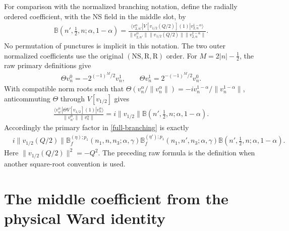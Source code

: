 \documentclass[12pt]{article}
\newcommand{\ie}{\begin{equation}\begin{aligned}}
\newcommand{\fe}{\end{aligned}\end{equation}}
\newcommand{\NS}{\mathrm{NS}}
\newcommand{\R}{\mathrm{R}}
\numberwithin{equation}{section}
\begin{document}
For comparison with the normalized branching notation, define the
radially ordered coefficient, with the NS field in the middle slot, by
\ie
 \mathbb B(n',\tfrac12,n;\alpha,1-\alpha)
 =\frac{\langle v_{2,n'}^\alpha|V[v_{1/2}(Q/2)](1)
 |v_{2,n}^{1-\alpha}\rangle}
 {\|v_{2,n'}^\alpha\|\|v_{1/2}(Q/2)\|
  \|v_{2,n}^{1-\alpha}\|}.
 \label{radial-B}
\fe
No permutation of punctures is implicit in this notation.  The two
outer normalized coefficients use the original $(\NS,\R,\R)$ order.
For $M=2|n|-\frac12$, the raw primary definitions give
\ie
 \Theta v_n^0=-2^{(-1)^M/2}v_n^1,\qquad
 \Theta v_n^1=2^{-(-1)^M/2}v_n^0.
 \label{theta-primary}
\fe
With compatible norm roots such that
$\Theta(v_n^\alpha/\|v_n^\alpha\|)=-i
v_n^{1-\alpha}/\|v_n^{1-\alpha}\|$, anticommuting $\Theta$ through
$V[v_{1/2}]$ gives
\ie
 \frac{\langle v_{n'}^\alpha|\Theta V[v_{1/2}](1)|v_n^\alpha\rangle}
 {\|v_{n'}^\alpha\|\|v_n^\alpha\|}
 =i\|v_{1/2}\|\mathbb B(n',\tfrac12,n;\alpha,1-\alpha).
 \label{normalized-middle}
\fe
Accordingly the primary factor in \eqref{full-branching} is exactly
\ie
 &i\|v_{1/2}(Q/2)\|
 \mathbb B_f^{(\eta);p_1}(n_1,n,n_3;\alpha,\gamma)
 \mathbb B_f^{(\eta');p_1}(n_1,n',n_3;\alpha,\gamma)
 \mathbb B(n',\tfrac12,n;\alpha,1-\alpha).
\fe
Here $\|v_{1/2}(Q/2)\|^2=-Q^2$.  The preceding raw formula is the
definition when another square-root convention is used.

\section{The middle coefficient from the physical Ward identity}
\end{document}
